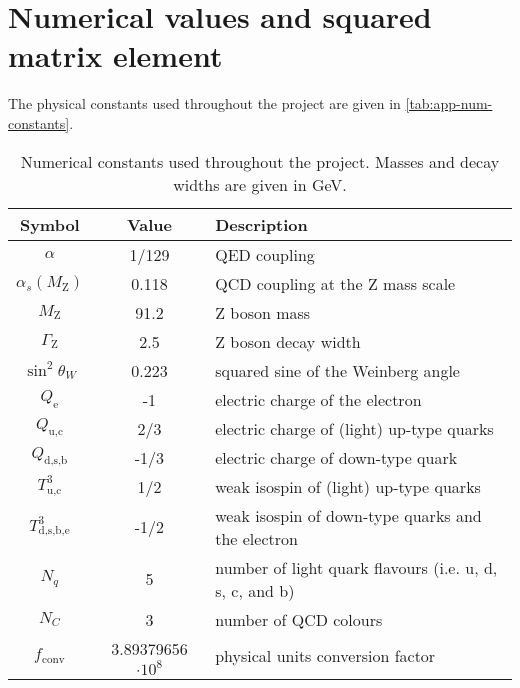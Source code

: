 \section{Numerical values and squared matrix element} \label{sec:app-num-values}

The physical constants used throughout the project are given in \autoref{tab:app-num-constants}.
\begin{table}[ht!]
    \centering
    \renewcommand{\arraystretch}{1.3}
    \setlength{\arrayrulewidth}{0.3mm}
    \begin{tabular}{ccl}
        \hline Symbol & Value & Description \\ \hline
        $\alpha$ & 1/129 & QED coupling \\
        $\alpha_{s}(M_{\text{Z}})$ & 0.118 & QCD coupling at the Z mass scale \\
        $M_{\text{Z}}$ & 91.2 & Z boson mass \\
        $\Gamma_{\text{Z}}$ & 2.5 & Z boson decay width \\
        $\sin^{2}{\theta_{W}}$ & 0.223 & squared sine of the Weinberg angle \\
        $Q_{\text{e}}$ & -1 & electric charge of the electron \\
        $Q_{\text{u,c}}$ & 2/3 & electric charge of (light) up-type quarks \\
        $Q_{\text{d,s,b}}$ & -1/3 & electric charge of down-type quark \\
        $T^{3}_{\text{u,c}}$ & 1/2 & weak isospin of (light) up-type quarks \\
        $T^{3}_{\text{d,s,b,e}}$ & -1/2 & weak isospin of down-type quarks and the electron \\
        $N_{q}$ & 5 & number of light quark flavours (i.e. u, d, s, c, and b) \\
        $N_{C}$ & 3 & number of QCD colours \\
        $f_{\text{conv}}$ & 3.89379656 $\cdot 10^{8}$ & physical units conversion factor \\ \hline
    \end{tabular}
    \caption{Numerical constants used throughout the project. Masses and decay widths are given in GeV.}
    \label{tab:app-num-constants}
\end{table}

